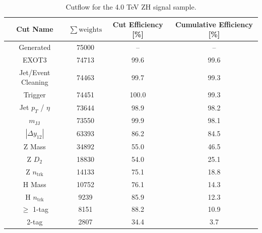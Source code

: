 \begin{table}[htbp!]
    \normalsize
    \centering
    \begin{tabular}{c||ccc}
        Cut Name & $\sum{\mathrm{weights}}$ & Cut Efficiency [\%] & Cumulative Efficiency [\%] \\ \hline
        Generated & 75000 & -- & --\\ \hline
        EXOT3 & 74713 & 99.6 & 99.6\\ \hline
        Jet/Event Cleaning & 74463 & 99.7 & 99.3\\ \hline
        Trigger & 74451 & 100.0 & 99.3\\ \hline
        Jet $p_{T}$ / $\eta$ & 73644 & 98.9 & 98.2\\ \hline
        $m_{\mathrm{JJ}}$ & 73550 & 99.9 & 98.1\\ \hline
        $|\Delta y_{12}|$ & 63393 & 86.2 & 84.5\\ \hline
        Z Mass & 34892 & 55.0 & 46.5\\ \hline
        Z $D_{2}$ & 18830 & 54.0 & 25.1\\ \hline
        Z $n_{\mathrm{trk}}$ & 14133 & 75.1 & 18.8\\ \hline
        H Mass & 10752 & 76.1 & 14.3\\ \hline
        H $n_{\mathrm{trk}}$ & 9239 & 85.9 & 12.3\\ \hline
        $\geq$ 1-tag & 8151 & 88.2 & 10.9\\ \hline
        2-tag & 2807 & 34.4 & 3.7\\ \hline
    \end{tabular}
    \caption{Cutflow for the 4.0 TeV ZH signal sample. }
    \label{tab:zh_4TeV_cutflow}
\end{table}

